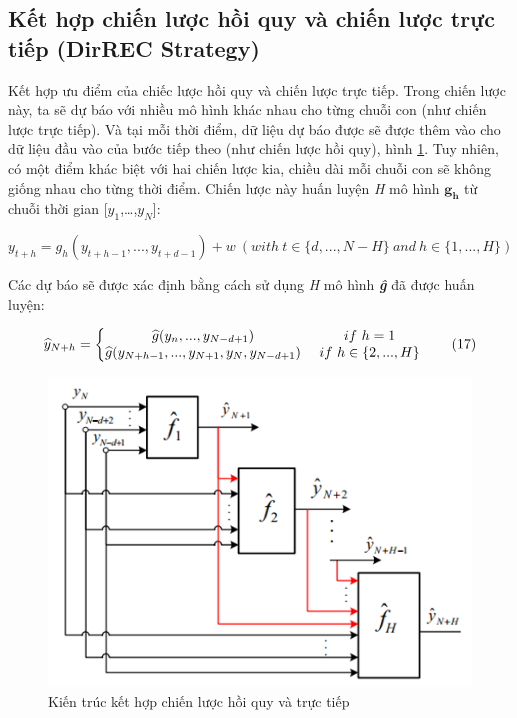 \subsection{Kết hợp chiến lược hồi quy và chiến lược trực tiếp (DirREC Strategy)}
Kết hợp ưu điểm của chiếc lược hồi quy và chiến lược trực tiếp. Trong chiến lược này, ta sẽ dự báo với nhiều mô hình khác nhau cho từng chuỗi con (như chiến lược trực tiếp). Và tại mỗi thời điểm, dữ liệu dự báo được sẽ được thêm vào cho dữ liệu đầu vào của bước tiếp theo (như chiến lược hồi quy), hình \ref{fig:3-3}. Tuy nhiên, có một điểm khác biệt với hai chiến lược kia, chiều dài mỗi chuỗi con sẽ không giống nhau cho từng thời điểm. Chiến lược này huấn luyện \textit{H} mô hình $\mathbf{g_h}$ từ chuỗi thời gian [$y_{1}$,…,$y_{N}$]:

\begin{equation}
\label{eq:16}
y_{t+h}=g_h(y_{t+h-1},...,y_{t+d-1} )+w \:  (with \: t\in\{d,...,N-H\} \: and \: h\in\{1,...,H\})
\tag{16}
\end{equation}

Các dự báo sẽ được xác định bằng cách sử dụng \textit{H} mô hình \textit{\textbf{ĝ}} đã được huấn luyện:

\begin{equation}
\label{eq:17}
\widehat{y}_{N+h} = \left\{\begin{matrix}
\widehat{g}(y_n,...,y_{N-d+1}) & $     $if $ $ h =1 
\\ \widehat{g}(y_{N+h-1},...,y_{N+1},y_N,y_{N-d+1}) & $ $if $ $ h\in\{2,...,H\}
\end{matrix}\right.
\tag{17}
\end{equation}

\begin{figure}[H]
    \centering
    \includegraphics[scale=1.25]{./content/images/3-3.png}
    \caption{Kiến trúc kết hợp chiến lược hồi quy và trực tiếp \cite{st17}}
    \label{fig:3-3}
\end{figure}

